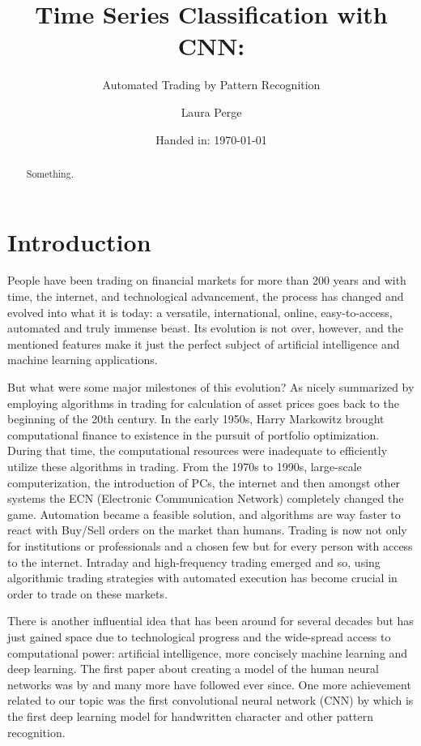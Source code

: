 \documentclass[11pt, a4paper]{article}
\author{Laura Perge}
\title{Time Series Classification with CNN:}
\subtitle{ Automated Trading by Pattern Recognition}
\date{Handed in: \today}
\begin{document}
\maketitle

\tableofcontents

\begin{abstract}
    Something.
\end{abstract}

\section{Introduction}
People have been trading on financial markets for more than 200 years and with time, the internet, and technological advancement, the process has changed and evolved into what it is today:  
a versatile, international, online, easy-to-access, automated and truly immense beast. Its evolution is not over, however, and the mentioned features make it just the perfect subject of 
artificial intelligence and machine learning applications. 

But what were some major milestones of this evolution? As nicely summarized by \cite{rialtohistory}  employing algorithms in trading for calculation of asset prices goes back to the beginning of the 20th century. In the early 1950s, Harry Markowitz brought computational finance to existence in the pursuit of portfolio optimization. During that time, the computational 
resources were inadequate to efficiently utilize these algorithms in trading. From the 1970s to 1990s, 
large-scale computerization, the introduction of PCs, the internet and then amongst other systems the ECN (Electronic Communication Network) completely changed the game. Automation became a 
feasible solution, and algorithms are way faster to react with Buy/Sell orders on the market than humans. Trading is now not only for institutions or professionals and a chosen few but for 
every person with access to the internet. Intraday and high-frequency trading emerged and so, using algorithmic trading strategies with automated execution has become crucial in order to 
trade on these markets. 

There is another influential idea that has been around for several decades but has just gained space due to technological progress and the wide-spread access to computational power: artificial intelligence, more 
concisely machine learning and deep learning. 
The first paper about creating a model of the human neural networks was by \cite{mcculloch1943logical} and many more have followed ever since. 
One more achievement related to our topic was the first convolutional neural network (CNN) by \cite{fukushima1979neural} which is the first deep learning model for handwritten character and other 
pattern recognition.
\end{document}
